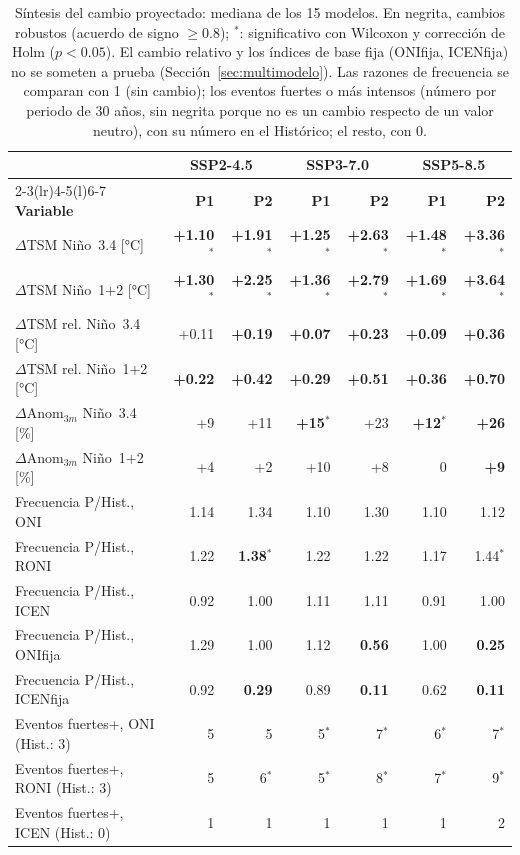 \documentclass[11pt,a4paper]{article}
\begin{document}
\begin{table}[htbp]
\caption[Síntesis del cambio proyectado (15 modelos).]{Síntesis del cambio proyectado: mediana de los 15 modelos. En negrita, cambios robustos (acuerdo de signo $\geq 0.8$); $^{*}$: significativo con Wilcoxon y corrección de Holm ($p<0.05$). El cambio relativo y los índices de base fija (ONIfija, ICENfija) no se someten a prueba (Sección~\ref{sec:multimodelo}). Las razones de frecuencia se comparan con 1 (sin cambio); los eventos fuertes o más intensos (número por periodo de 30 años, sin negrita porque no es un cambio respecto de un valor neutro), con su número en el Histórico; el resto, con 0.}
\label{tab:sintesis}
\centering
\footnotesize
\setlength{\tabcolsep}{4pt}
\begin{tabular}{@{}lrrrrrr@{}}
\toprule
 & \multicolumn{2}{c}{\textbf{SSP2-4.5}} & \multicolumn{2}{c}{\textbf{SSP3-7.0}} & \multicolumn{2}{c}{\textbf{SSP5-8.5}} \\
\cmidrule(lr){2-3}\cmidrule(lr){4-5}\cmidrule(l){6-7}
\textbf{Variable} & \textbf{P1} & \textbf{P2} & \textbf{P1} & \textbf{P2} & \textbf{P1} & \textbf{P2} \\
\midrule
$\Delta$TSM Niño~3.4 [°C] & \textbf{+1.10}$^{*}$ & \textbf{+1.91}$^{*}$ & \textbf{+1.25}$^{*}$ & \textbf{+2.63}$^{*}$ & \textbf{+1.48}$^{*}$ & \textbf{+3.36}$^{*}$ \\
$\Delta$TSM Niño~1+2 [°C] & \textbf{+1.30}$^{*}$ & \textbf{+2.25}$^{*}$ & \textbf{+1.36}$^{*}$ & \textbf{+2.79}$^{*}$ & \textbf{+1.69}$^{*}$ & \textbf{+3.64}$^{*}$ \\
$\Delta$TSM rel. Niño~3.4 [°C] & +0.11 & \textbf{+0.19} & \textbf{+0.07} & \textbf{+0.23} & \textbf{+0.09} & \textbf{+0.36} \\
$\Delta$TSM rel. Niño~1+2 [°C] & \textbf{+0.22} & \textbf{+0.42} & \textbf{+0.29} & \textbf{+0.51} & \textbf{+0.36} & \textbf{+0.70} \\
\midrule
$\Delta\mathrm{Anom}_{3m}$ Niño~3.4 [\%] & +9 & +11 & \textbf{+15}$^{*}$ & +23 & \textbf{+12}$^{*}$ & \textbf{+26} \\
$\Delta\mathrm{Anom}_{3m}$ Niño~1+2 [\%] & +4 & +2 & +10 & +8 & 0 & \textbf{+9} \\
\midrule
Frecuencia P/Hist., ONI & 1.14 & 1.34 & 1.10 & 1.30 & 1.10 & 1.12 \\
Frecuencia P/Hist., RONI & 1.22 & \textbf{1.38}$^{*}$ & 1.22 & 1.22 & 1.17 & 1.44$^{*}$ \\
Frecuencia P/Hist., ICEN & 0.92 & 1.00 & 1.11 & 1.11 & 0.91 & 1.00 \\
Frecuencia P/Hist., ONIfija & 1.29 & 1.00 & 1.12 & \textbf{0.56} & 1.00 & \textbf{0.25} \\
Frecuencia P/Hist., ICENfija & 0.92 & \textbf{0.29} & 0.89 & \textbf{0.11} & 0.62 & \textbf{0.11} \\
\midrule
Eventos fuertes+, ONI (Hist.: 3) & 5 & 5 & 5$^{*}$ & 7$^{*}$ & 6$^{*}$ & 7$^{*}$ \\
Eventos fuertes+, RONI (Hist.: 3) & 5 & 6$^{*}$ & 5$^{*}$ & 8$^{*}$ & 7$^{*}$ & 9$^{*}$ \\
Eventos fuertes+, ICEN (Hist.: 0) & 1 & 1 & 1 & 1 & 1 & 2 \\
\bottomrule
\end{tabular}
\end{table}
\end{document}
